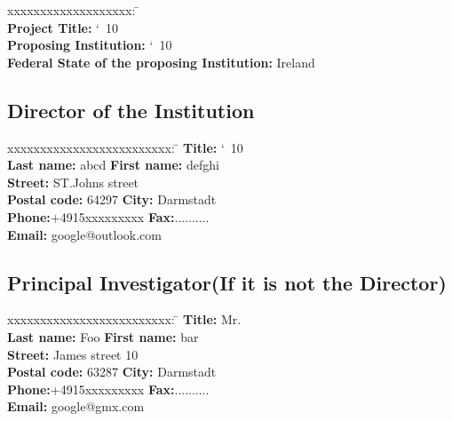 \documentclass[accentcolor=tud9c,nochapname,11pt]{tudexercise}
\makeatletter
\newcommand\saferead[1]{%
  \bgroup
  \let\do\@makeother
  \dospecials\catcode`\ 10
  \egroup 
}
\makeatother
\begin{document}
\begin{Form}
\begin{tabbing}
xxxxxxxxxxxxxxxxxxx: \= \kill  \\%
\textbf{Project Title:}  \saferead{proj_title.txt} \\
\textbf{Proposing Institution:}  	\saferead{prop_inst.txt} \\
\textbf{Federal State of the proposing Institution:}    Ireland \\
\end{tabbing}
\subsection{Director of the Institution}
\begin{tabbing}
xxxxxxxxxxxxxxxxxxxxxxxxx:  \= \kill
\textbf{Title:}    \saferead{dir_title.txt} \\
\textbf{Last name:} abcd  \>  \textbf{First name:} defghi  \\
\textbf{Street:} ST.Johns street  \\
\textbf{Postal code:} 64297   \> \textbf{City:} Darmstadt  \\
\textbf{Phone:}+4915xxxxxxxxx  \> \textbf{Fax:}..........   \\
\textbf{Email:} google@outlook.com \\
\end{tabbing}
\subsection{Principal Investigator(If it is not the Director)}
\begin{tabbing}
xxxxxxxxxxxxxxxxxxxxxxxxx:  \= \kill
\textbf{Title:}   Mr. \\
\textbf{Last name:} Foo  \>  \textbf{First name:} bar  \\
\textbf{Street:} James street 10  \\
\textbf{Postal code:} 63287   \> \textbf{City:} Darmstadt  \\
\textbf{Phone:}+4915xxxxxxxxx  \> \textbf{Fax:}..........  \\
\textbf{Email:} google@gmx.com \\
\end{tabbing}

\end{Form}
\end{document}
